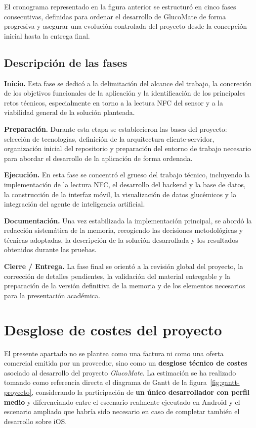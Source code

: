 El cronograma representado en la figura anterior se estructuró en cinco fases consecutivas, definidas para ordenar el desarrollo de GlucoMate de forma progresiva y asegurar una evolución controlada del proyecto desde la concepción inicial hasta la entrega final.

\subsection{Descripción de las fases}
\label{subsec:descripcion-fases-gantt}

\textbf{Inicio.} Esta fase se dedicó a la delimitación del alcance del trabajo, la concreción de los objetivos funcionales de la aplicación y la identificación de los principales retos técnicos, especialmente en torno a la lectura NFC del sensor y a la viabilidad general de la solución planteada.

\textbf{Preparación.} Durante esta etapa se establecieron las bases del proyecto: selección de tecnologías, definición de la arquitectura cliente-servidor, organización inicial del repositorio y preparación del entorno de trabajo necesario para abordar el desarrollo de la aplicación de forma ordenada.

\textbf{Ejecución.} En esta fase se concentró el grueso del trabajo técnico, incluyendo la implementación de la lectura NFC, el desarrollo del backend y la base de datos, la construcción de la interfaz móvil, la visualización de datos glucémicos y la integración del agente de inteligencia artificial.

\textbf{Documentación.} Una vez estabilizada la implementación principal, se abordó la redacción sistemática de la memoria, recogiendo las decisiones metodológicas y técnicas adoptadas, la descripción de la solución desarrollada y los resultados obtenidos durante las pruebas.

\textbf{Cierre / Entrega.} La fase final se orientó a la revisión global del proyecto, la corrección de detalles pendientes, la validación del material entregable y la preparación de la versión definitiva de la memoria y de los elementos necesarios para la presentación académica.

\section{Desglose de costes del proyecto}
\label{sec:desglose-costes}

El presente apartado no se plantea como una factura ni como una oferta comercial emitida por
un proveedor, sino como un \textbf{desglose técnico de costes} asociado al desarrollo del
proyecto \textit{GlucoMate}. La estimación se ha realizado tomando como referencia directa el
diagrama de Gantt de la figura~\ref{fig:gantt-proyecto}, considerando la participación de
\textbf{un único desarrollador con perfil medio} y diferenciando entre el escenario realmente
ejecutado en Android y el escenario ampliado que habría sido necesario en caso de completar
también el desarrollo sobre iOS.

